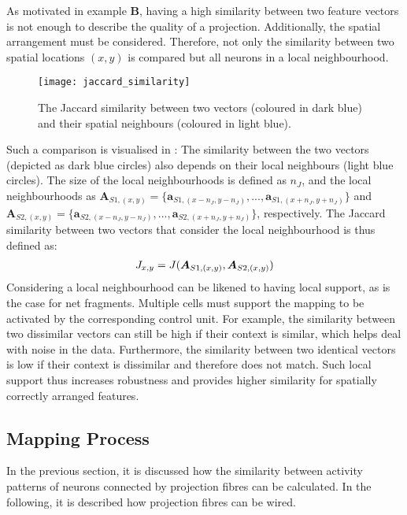 As motivated in  example $\boldsymbol{B}$, having a high similarity between two feature vectors is not enough to describe the quality of a projection.
Additionally, the spatial arrangement must be considered.
Therefore, not only the similarity between two spatial locations $(x,y)$ is compared but all neurons in a local neighbourhood.
\begin{figure}[h]
    \centering
    \texttt{[image: jaccard\_similarity]}
    \caption[Similarity between two vectors and their spatial neighbours]{The Jaccard similarity between two vectors (coloured in dark blue) and their spatial neighbours (coloured in light blue).}
\end{figure}
Such a comparison is visualised in :
The similarity between the two vectors (depicted as dark blue circles) also depends on their local neighbours (light blue circles).
The size of the local neighbourhoods is defined as $n_J$, and the local neighbourhoods as $\boldsymbol{A}_{S1,(x,y)} = \{ \boldsymbol{a}_{S1,(x-n_J,y-n_J)}, ..., \boldsymbol{a}_{S1,(x+n_J,y+n_J)}\}$ and $\boldsymbol{A}_{S2,(x,y)} = \{ \boldsymbol{a}_{S2,(x-n_J,y-n_J)}, ..., \boldsymbol{a}_{S2,(x+n_J,y+n_J)}\}$, respectively.
The Jaccard similarity between two vectors that consider the local neighbourhood is thus defined as:
%
\begin{align}\eqlbl{jaccard2}
	J_{x,y} = J(\boldsymbol{A}_{S1,(x,y)}, \boldsymbol{A}_{S2,(x,y)})
\end{align}
%
Considering a local neighbourhood can be likened to having local support, as is the case for net fragments. Multiple cells must support the mapping to be activated by the corresponding control unit. For example, the similarity between two dissimilar vectors can still be high if their context is similar, which helps deal with noise in the data.
Furthermore, the similarity between two identical vectors is low if their context is dissimilar and therefore does not match.
Such local support thus increases robustness and provides higher similarity for spatially correctly arranged features.


\subsection{Mapping Process}
In the previous section, it is discussed how the similarity between activity patterns of neurons connected by projection fibres can be calculated.
In the following, it is described how projection fibres can be wired.

